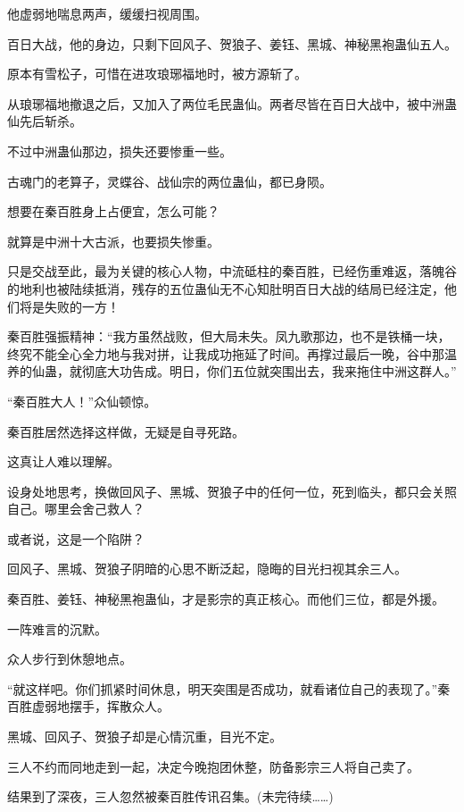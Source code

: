 \begin{this_body}
他虚弱地喘息两声，缓缓扫视周围。

百日大战，他的身边，只剩下回风子、贺狼子、姜钰、黑城、神秘黑袍蛊仙五人。

原本有雪松子，可惜在进攻琅琊福地时，被方源斩了。

从琅琊福地撤退之后，又加入了两位毛民蛊仙。两者尽皆在百日大战中，被中洲蛊仙先后斩杀。

不过中洲蛊仙那边，损失还要惨重一些。

古魂门的老算子，灵蝶谷、战仙宗的两位蛊仙，都已身陨。

想要在秦百胜身上占便宜，怎么可能？

就算是中洲十大古派，也要损失惨重。

只是交战至此，最为关键的核心人物，中流砥柱的秦百胜，已经伤重难返，落魄谷的地利也被陆续抵消，残存的五位蛊仙无不心知肚明百日大战的结局已经注定，他们将是失败的一方！

秦百胜强振精神：“我方虽然战败，但大局未失。凤九歌那边，也不是铁桶一块，终究不能全心全力地与我对拼，让我成功拖延了时间。再撑过最后一晚，谷中那温养的仙蛊，就彻底大功告成。明日，你们五位就突围出去，我来拖住中洲这群人。”

“秦百胜大人！”众仙顿惊。

秦百胜居然选择这样做，无疑是自寻死路。

这真让人难以理解。

设身处地思考，换做回风子、黑城、贺狼子中的任何一位，死到临头，都只会关照自己。哪里会舍己救人？

或者说，这是一个陷阱？

回风子、黑城、贺狼子阴暗的心思不断泛起，隐晦的目光扫视其余三人。

秦百胜、姜钰、神秘黑袍蛊仙，才是影宗的真正核心。而他们三位，都是外援。

一阵难言的沉默。

众人步行到休憩地点。

“就这样吧。你们抓紧时间休息，明天突围是否成功，就看诸位自己的表现了。”秦百胜虚弱地摆手，挥散众人。

黑城、回风子、贺狼子却是心情沉重，目光不定。

三人不约而同地走到一起，决定今晚抱团休整，防备影宗三人将自己卖了。

结果到了深夜，三人忽然被秦百胜传讯召集。(未完待续……)

\end{this_body}


